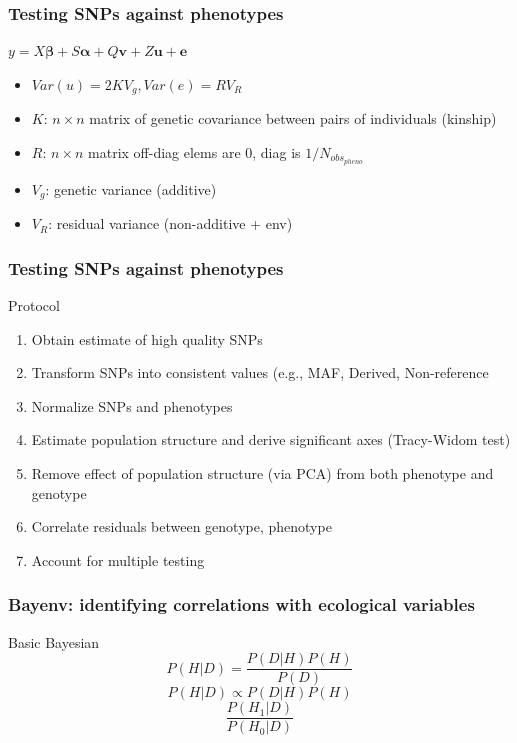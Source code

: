 \begin{frame}
\frametitle{Testing SNPs against phenotypes}
\begin{block}{}
\begin{center}
\Large{$y=X \bm{\beta} + S \bm{\alpha} + Q \bm{v} + Z \bm{u} + \bm{e}$}
\end{center}
\begin{itemize}
\item{$Var(u) = 2KV_g, Var(e) = RV_R$}
\item{$K$: $n \times n$ matrix of genetic covariance between pairs of
individuals (kinship)}
\item{$R$: $n \times n$ matrix off-diag elems are 0, diag is
$1/N_{{obs}_{pheno}}$}
\item{$V_g$: genetic variance (additive)}
\item{$V_R$: residual variance (non-additive + env)}
\end{itemize}
\end{block}
\tiny
\citet{Yu:2006ij}
\end{frame}

\begin{frame}
\frametitle{Testing SNPs against phenotypes}
\begin{block}{Protocol}
\begin{enumerate}
\item{Obtain estimate of high quality SNPs}
\item{Transform SNPs into consistent values (e.g., MAF, Derived, Non-reference}
\item{Normalize SNPs and phenotypes}
\item{Estimate population structure and derive significant axes (Tracy-Widom
test)}
\item{Remove effect of population structure (via PCA) from both phenotype and 
genotype}
\item{Correlate residuals between genotype, phenotype}
\item{Account for multiple testing}
\end{enumerate}
\end{block}
\tiny
\citep{Patterson:2006ki,Eckert:2010hd}
\end{frame}


\begin{frame}
\frametitle{Bayenv: identifying correlations with ecological
variables}
\begin{block}{Basic Bayesian}
\begin{equation}
P(H | D) = \frac{P(D|H)P(H)}{P(D)}	
\end{equation}
\begin{equation}
P(H|D) \propto P(D|H)P(H)
\end{equation}
\begin{equation}
\frac{P(H_1|D)}{P(H_0|D)}
\end{equation}
\end{block}
\end{frame}


